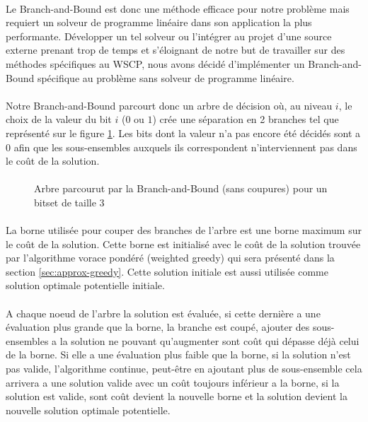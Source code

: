 \documentclass[12pt,letterpaper,twoside]{article}
\begin{document}
			\paragraph*{}
				Le Branch-and-Bound est donc une méthode efficace pour notre problème mais requiert un solveur de programme linéaire dans son application la plus performante. Développer un tel solveur ou l'intégrer au projet d'une source externe prenant trop de temps et s'éloignant de notre but de travailler sur des méthodes spécifiques au WSCP, nous avons décidé d'implémenter un Branch-and-Bound spécifique au problème sans solveur de programme linéaire.
			\paragraph*{}
				Notre Branch-and-Bound parcourt donc un arbre de décision où, au niveau \(i\), le choix de la valeur du bit \(i\) (\(0\) ou \(1\)) crée une séparation en 2 branches tel que représenté sur le figure \ref{fig:bnb}. Les bits dont la valeur n'a pas encore été décidés sont a \(0\) afin que les sous-ensembles auxquels ils correspondent n'interviennent pas dans le coût de la solution.
			\paragraph*{}
			\begin{figure}[H]
				\centering%
				\resizebox{0.75\textwidth}{!}{}%
				\caption{Arbre parcourut par la Branch-and-Bound (sans coupures) pour un bitset de taille 3}%
				\label{fig:bnb}%
			\end{figure}
			\paragraph*{}
				La borne utilisée pour couper des branches de l'arbre est une borne maximum sur le coût de la solution. Cette borne est initialisé avec le coût de la solution trouvée par l'algorithme vorace pondéré (weighted greedy) qui sera présenté dans la section \ref{sec:approx-greedy}. Cette solution initiale est aussi utilisée comme solution optimale potentielle initiale.
			\paragraph*{}
				A chaque noeud de l'arbre la solution est évaluée, si cette dernière a une évaluation plus grande que la borne, la branche est coupé, ajouter des sous-ensembles a la solution ne pouvant qu'augmenter sont coût qui dépasse déjà celui de la borne. Si elle a une évaluation plus faible que la borne, si la solution n'est pas valide, l'algorithme continue, peut-être en ajoutant plus de sous-ensemble cela arrivera a une solution valide avec un coût toujours inférieur a la borne, si la solution est valide, sont coût devient la nouvelle borne et la solution devient la nouvelle solution optimale potentielle.
\end{document}

